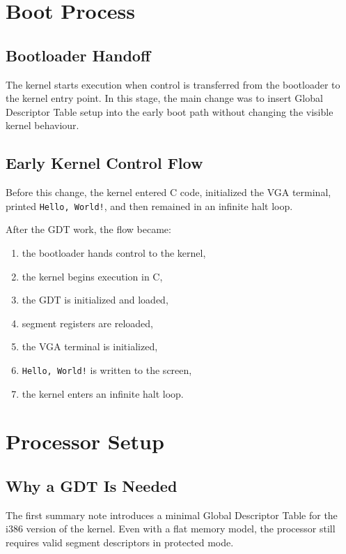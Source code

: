 
\section{Boot Process}

\subsection{Bootloader Handoff}
The kernel starts execution when control is transferred from the bootloader to the kernel entry point. In this stage, the main change was to insert Global Descriptor Table setup into the early boot path without changing the visible kernel behaviour.

\subsection{Early Kernel Control Flow}
Before this change, the kernel entered C code, initialized the VGA terminal, printed \texttt{Hello, World!}, and then remained in an infinite halt loop.

After the GDT work, the flow became:
\begin{enumerate}
  \item the bootloader hands control to the kernel,
  \item the kernel begins execution in C,
  \item the GDT is initialized and loaded,
  \item segment registers are reloaded,
  \item the VGA terminal is initialized,
  \item \texttt{Hello, World!} is written to the screen,
  \item the kernel enters an infinite halt loop.
\end{enumerate}

\section{Processor Setup}

\subsection{Why a GDT Is Needed}
The first summary note introduces a minimal Global Descriptor Table for the i386 version of the kernel. Even with a flat memory model, the processor still requires valid segment descriptors in protected mode.

